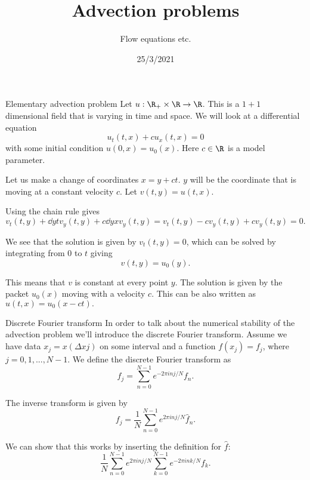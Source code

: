 

\title{Advection problems}
\subtitle{Flow equations etc.}
\date{25/3/2021}
\date{}


	
	\maketitle
	

\begin{frame}{Elementary advection problem}
	Let $ u: \R_{+} \times \R \to \R $. This is a $ 1+1 $ dimensional field that is varying in time and space. We will look at a differential equation
	\[ u_t(t,x) + c u_x(t,x) = 0 \]
	with some initial condition $ u(0,x) = u_{0}(x) $. Here $ c \in \R $ is a model parameter.
	
	\pause
	Let us make a change of coordinates $ x = y + ct $. $ y $ will be the coordinate that is moving at a constant velocity $ c $. Let $ v(t,y) = u(t,x) $. 
	
	\pause
	Using the chain rule gives
	\[ v_t(t,y) + \dd{y}{t} v_y(t,y) + c \dd{y}{x} v_y(t,y) = v_t(t,y) - c v_y(t,y) + c v_y(t,y) = 0. \]
	
	\pause
	We see that the solution is given by $ v_t(t,y) = 0 $, which can be solved by integrating from 0 to $ t $ giving
	\[ v(t,y) = u_{0}(y). \]
	
	\pause
	This means that $ v $ is constant at every point $ y $. The solution is given by the packet $ u_{0}(x) $ moving with a velocity $ c $. This can be also written as $ u(t,x) = u_0(x - ct). $
\end{frame}

\begin{frame}{Discrete Fourier transform}
	In order to talk about the numerical stability of the advection problem we'll introduce the \alert{discrete Fourier transform}. Assume we have data $ x_j = x(\Delta x j) $ on some interval and a function $ f(x_j) = f_j $, where $ j= 0,1,...,N-1 $. We define the discrete Fourier transform as
	\[ \hat{f}_j = \sum_{n=0}^{N-1} e^{-2\pi i nj/N} f_{n}. \]
	
	\pause
	The inverse transform is given by
	\[ f_{j} = \frac{1}{N} \sum_{n=0}^{N-1} e^{2\pi i n j/N} \hat{f}_{n}. \]
	
	\pause
	We can show that this works by inserting the definition for $ \hat{f} $:
	\[ \frac{1}{N} \sum_{n=0}^{N-1} e^{2\pi i n j/N} \sum_{k=0}^{N-1} e^{-2\pi i nk/N} f_{k}. \]
\end{frame}

